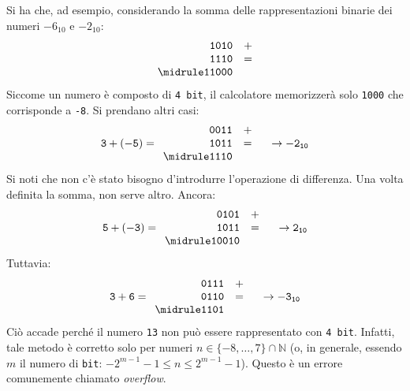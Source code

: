 Si ha che, ad esempio, considerando la somma delle rappresentazioni binarie dei numeri $-6_{10}$ e $-2_{10}$:
\[
	\begin{array}{r l}
\mathtt{1010}	&+	\\
\mathtt{1110}	&=	\\
		\midrule
\mathtt{11000}
	\end{array}
\]
Siccome un numero è composto di \lstinline!4 bit!, il calcolatore memorizzerà solo \lstinline!1000! che corrisponde a \lstinline!-8!. Si prendano altri casi:
\[
\mathtt{
3+(-5)=
	\begin{array}{r l}
\mathtt{0011}	&+	\\
\mathtt{1011}	&=	\\
		\midrule
\mathtt{1110}
	\end{array}
\quad \rightarrow-2_{10}
}
\]
Si noti che non c'è stato bisogno d'introdurre l'operazione di differenza. Una volta definita la somma, non serve altro. Ancora:
\[
\mathtt{
5+(-3)=
	\begin{array}{r l}
\mathtt{0101}	&+	\\
\mathtt{1011}	&=	\\
		\midrule
\mathtt{10010}
	\end{array}
\quad \rightarrow2_{10}
}
\]
Tuttavia:
\[
\mathtt{
3+6=
	\begin{array}{r l}
\mathtt{0111}	&+	\\
\mathtt{0110}	&=	\\
		\midrule
\mathtt{1101}
	\end{array}
\quad \rightarrow-3_{10}
}
\]
Ciò accade perché il numero \lstinline!13! non può essere rappresentato con \lstinline!4 bit!. Infatti, tale metodo è corretto solo per numeri $n\in\{-8,\dots,7\}\cap\mathbb{N}$ (o, in generale, essendo $m$ il numero di \lstinline!bit!: $-2^{m-1}-1\le n \le 2^{m-1}-1$). Questo è un errore comunemente chiamato \emph{overflow}.

